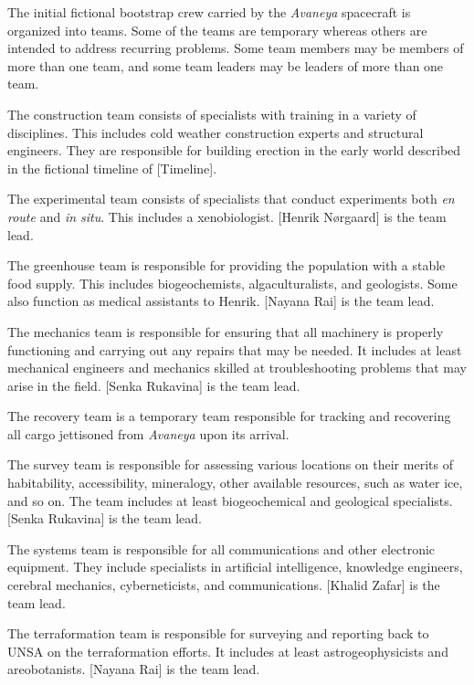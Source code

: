 

The initial fictional bootstrap crew carried by the {\it Avaneya} spacecraft is organized into teams. Some of the teams are temporary whereas others are intended to address recurring problems. Some team members may be members of more than one team, and some team leaders may be leaders of more than one team.

The construction team consists of specialists with training in a variety of disciplines. This includes cold weather construction experts and structural engineers. They are responsible for building erection in the early world described in the fictional timeline of [Timeline].

The experimental team consists of specialists that conduct experiments both {\it en route} and {\it in situ}. This includes a xenobiologist. [Henrik Nørgaard] is the team lead.

The greenhouse team is responsible for providing the population with a stable food supply. This includes biogeochemists, algaculturalists, and geologists. Some also function as medical assistants to Henrik. [Nayana Rai] is the team lead.

The mechanics team is responsible for ensuring that all machinery is properly functioning and carrying out any repairs that may be needed. It includes at least mechanical engineers and mechanics skilled at troubleshooting problems that may arise in the field. [Senka Rukavina] is the team lead.

The recovery team is a temporary team responsible for tracking and recovering all cargo jettisoned from {\it Avaneya} upon its arrival.

The survey team is responsible for assessing various locations on their merits of habitability, accessibility, mineralogy, other available resources, such as water ice, and so on. The team includes at least biogeochemical and geological specialists. [Senka Rukavina] is the team lead.

The systems team is responsible for all communications and other electronic equipment. They include specialists in artificial intelligence, knowledge engineers, cerebral mechanics, cyberneticists, and communications. [Khalid Zafar] is the team lead.

The terraformation team is responsible for surveying and reporting back to UNSA on the terraformation efforts. It includes at least astrogeophysicists and areobotanists. [Nayana Rai] is the team lead.

